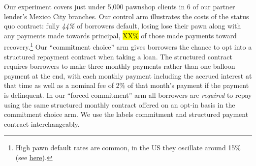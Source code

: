 \documentclass[12pt, a4paper]{article}
\begin{document}

Our experiment covers just under 5,000 pawnshop clients in 6 of our partner lender's Mexico City branches. Our control arm illustrates the costs of the status quo contract: fully \emph{44\%} of borrowers default, losing lose their pawn along with any payments made towards principal, \hl{XX\%} of those made payments toward recovery.\footnote{High pawn default rates are common, in the US they oscillate around 15\% (see \href{https://tinyurl.com/yc2x5bjf}{here}).} Our ``commitment choice'' arm gives borrowers the chance to opt into a structured repayment contract when taking a loan. The structured contract requires borrowers to make three monthly payments rather than one balloon payment at the end, with each monthly payment including the accrued interest at that time as well as a nominal fee of 2\% of that month's payment if the payment is delinquent.  In our ``forced commitment'' arm all borrowers are \emph{required} to repay using the same structured monthly contract offered on an opt-in basis in the commitment choice arm. We use the labels commitment and structured payment contract interchangeably.
\end{document}
